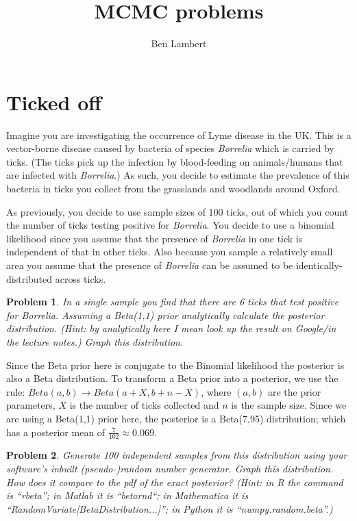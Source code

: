 \documentclass{article}
\title{MCMC problems}
\date{}
\author{Ben Lambert}
\newtheorem{problem}{Problem}[section]
\begin{document}
\maketitle

\section{Ticked off}
Imagine you are investigating the occurrence of Lyme disease in the UK. This is a vector-borne disease caused by bacteria of species \textit{Borrelia} which is carried by ticks. (The ticks pick up the infection by blood-feeding on animals/humans that are infected with \textit{Borrelia}.) As such, you decide to estimate the prevalence of this bacteria in ticks you collect from the grasslands and woodlands around Oxford.

As previously, you decide to use sample sizes of 100 ticks, out of which you count the number of ticks testing positive for \textit{Borrelia}. You decide to use a binomial likelihood since you assume that the presence of \textit{Borrelia} in one tick is independent of that in other ticks. Also because you sample a relatively small area you assume that the presence of \textit{Borrelia} can be assumed to be identically-distributed across ticks. 

\begin{problem}
In a single sample you find that there are 6 ticks that test positive for \textit{Borrelia}. Assuming a Beta(1,1) prior analytically calculate the posterior distribution. (Hint: by analytically here I mean look up the result on Google/in the lecture notes.) Graph this distribution. 
\end{problem}

Since the Beta prior here is conjugate to the Binomial likelihood the posterior is also a Beta distribution. To transform a Beta prior into a posterior, we use the rule: $Beta(a,b)\rightarrow Beta(a+X,b+n-X)$, where $(a,b)$ are the prior parameters, $X$ is the number of ticks collected and $n$ is the sample size. Since we are using a Beta(1,1) prior here, the posterior is a Beta(7,95) distribution; which has a posterior mean of $\frac{7}{102}\approx 0.069$.

\begin{problem}
Generate 100 independent samples from this distribution using your software's inbuilt (pseudo-)random number generator. Graph this distribution. How does it compare to the pdf of the exact posterior? (Hint: in R the command is ``rbeta''; in Matlab it is ``betarnd``; in Mathematica it is ``RandomVariate[BetaDistribution...]''; in Python it is ``numpy.random.beta''.)
\end{problem}
\end{document}
